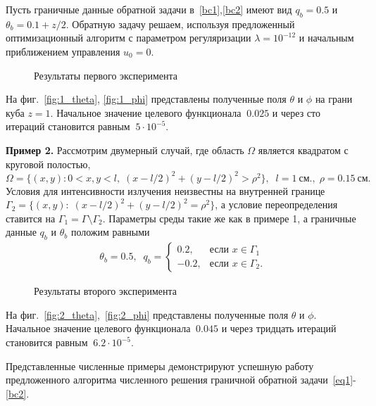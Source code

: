 Пусть граничные данные обратной задачи в~\eqref{bc1},\eqref{bc2} имеют вид $q_b = 0.5$ и $\theta_b=0.1 + z/2 $.
Обратную задачу решаем, используя предложенный оптимизационный алгоритм с параметром регуляризации
$\lambda=10^{-12}$ и начальным приближением управления $u_0 = 0$.
\begin{figure}[H]
    \centering
    \caption{Результаты первого эксперимента}
    \label{fig:1}
\end{figure}

На фиг.~\ref{fig:1_theta}, \ref{fig:1_phi} представлены полученные поля $\theta$ и $\phi$ на грани куба $z=1$.
Начальное значение целевого функционала $~0.025$ и
через сто итераций становится равным $~5\cdot 10^{-5}$.

\textbf{Пример 2.}
Рассмотрим двумерный случай, где область $\Omega$ является квадратом с круговой полостью,
\[
    \Omega=\{(x, y): 0< x,y< l,\; (x-l/2)^2+(y-l/2)^2>\rho^2\},\;\; l=1~\text{см.},
    \;\rho=0.15~\text{см.}
\]
Условия для интенсивности излучения неизвестны на внутренней границе $\Gamma_2=\{(x, y): \; (x-l/2)^2+(y-l/2)^2=\rho^2\}$,
а условие переопределения ставится на $\Gamma_1=\Gamma\setminus \Gamma_2.$
Параметры среды такие же как в примере 1, а
граничные данные $q_b$ и $\theta_b$ положим равными
\begin{gather*}
    \theta_b = 0.5, \;\;
    q_b =
    \begin{cases}
        0.2, & \text{если } x \in \Gamma_1 \\
        -0.2, & \text{если } x \in \Gamma_2.
    \end{cases}
\end{gather*}
\begin{figure}[H]
    \centering
    \caption{Результаты второго эксперимента}
    \label{fig:2}
\end{figure}
На фиг.~\ref{fig:2_theta},~\ref{fig:2_phi} представлены полученные поля $\theta$ и $\phi$.
Начальное значение целевого функционала $~0.045$ и
через тридцать итераций становится равным $~6.2\cdot 10^{-5}$.

Представленные численные примеры демонстрируют успешную работу предложенного алгоритма
численного решения граничной обратной задачи~\eqref{eq1}-\eqref{bc2}.
